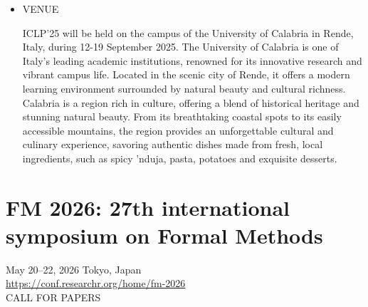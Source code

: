 \documentclass[prodmode,acmtecs]{acmsmall} %
\begin{document}
\begin{itemize}
\item  VENUE 
 
 ICLP’25 will be held on the campus of the University of Calabria in Rende, Italy, during 12-19 September 2025. The University of Calabria is one of Italy's leading academic institutions, renowned for its innovative research and vibrant campus life. Located in the scenic city of Rende, it offers a modern learning environment surrounded by natural beauty and cultural richness. Calabria is a region rich in culture, offering a blend of historical heritage and stunning natural beauty. From its breathtaking coastal spots to its easily accessible mountains, the region provides an unforgettable cultural and culinary experience, savoring authentic dishes made from fresh, local ingredients, such as spicy 'nduja, pasta, potatoes and exquisite desserts. 
 
\end{itemize}\section{FM 2026: 27th international symposium on Formal Methods}\label{FM2026}  May 20--22, 2026 Tokyo, Japan\\ 
  \href{https://conf.researchr.org/home/fm-2026}{https://conf.researchr.org/home/fm-2026}\\ 
CALL FOR PAPERS 
\end{document}
